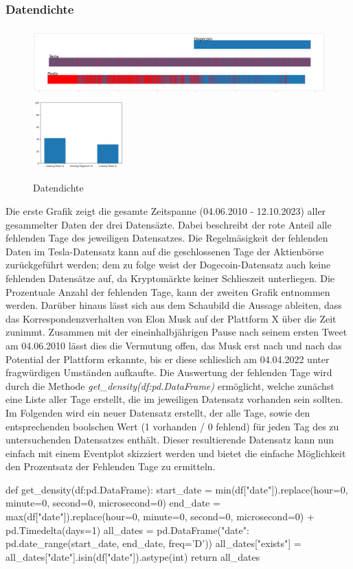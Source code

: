 \documentclass{article}
\begin{document}
\subsubsection{Datendichte}
\begin{figure}[!htb]
  	\includegraphics[width=.7\textwidth, height=100px]{../imgs/Dichte1.png}
	\includegraphics[width=.3\textwidth, height=100px]{../imgs/Dichte2.png}
 	\caption{Datendichte}
 	\label{fig:Datendichte}
\end{figure}
Die erste Grafik zeigt die gesamte Zeitspanne (04.06.2010 - 12.10.2023) aller gesammelter Daten der drei Datensäzte. Dabei beschreibt der rote Anteil alle fehlenden Tage des jeweiligen Datensatzes. Die Regelmäsigkeit der fehlenden Daten im Tesla-Datensatz kann auf die geschlossenen Tage der Aktienbörse zurückgeführt werden; dem zu folge weist der Dogecoin-Datensatz auch keine fehlenden Datensätze auf, da Kryptomärkte keiner Schlieszeit unterliegen.
Die Prozentuale Anzahl der fehlenden Tage, kann der zweiten Grafik entnommen werden. Darüber hinaus lässt sich aus dem Schaubild die Aussage ableiten, dass das Korrespondenzverhalten von Elon Musk auf der Plattform X über die Zeit zunimmt. Zusammen mit der eineinhalbjährigen Pause nach seinem ersten Tweet am 04.06.2010 lässt dies die Vermutung offen, das Musk erst nach und nach das Potential der Plattform erkannte, bis er diese schlieslich am 04.04.2022 unter fragwürdigen Umständen aufkaufte. 
Die Auswertung der fehlenden Tage wird durch die Methode \textit{get\_density(df:pd.DataFrame)} ermöglicht, welche zunächst eine Liste aller Tage erstellt, die im jeweiligen Datensatz vorhanden sein sollten. Im Folgenden wird ein neuer Datensatz erstellt, der alle Tage, sowie den entsprechenden boolschen Wert (1 vorhanden / 0 fehlend) für jeden Tag des zu untersuchenden Datensatzes enthält. Dieser resultierende Datensatz kann nun einfach mit einem Eventplot skizziert werden und bietet die einfache Möglichkeit den Prozentsatz der Fehlenden Tage zu ermitteln.
\begin{python}
def get_density(df:pd.DataFrame):
    start_date = min(df["date"]).replace(hour=0, minute=0, second=0, microsecond=0)
    end_date = max(df["date"]).replace(hour=0, minute=0, second=0, microsecond=0) + pd.Timedelta(days=1)
    all_dates = pd.DataFrame({"date": pd.date_range(start_date, end_date, freq='D')})
    all_dates["exists"] = all_dates["date"].isin(df["date"]).astype(int)
    return all_dates
\end{python}
\end{document}
